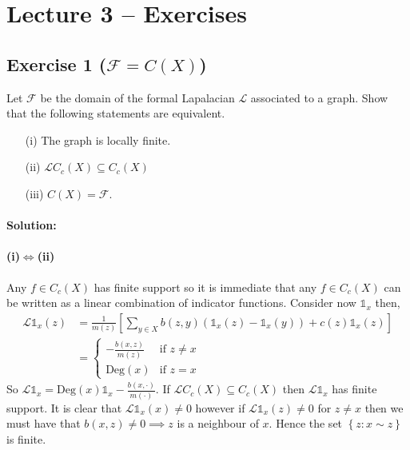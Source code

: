 \section{Lecture 3 -- Exercises}

\subsection{Exercise 1 (\texorpdfstring{$\mathcal{F}=C(X)$}))}

Let $\mathcal{F}$ be the domain of the formal Lapalacian $\mathcal{L}$ associated to a graph. Show that the following statements are equivalent.
\begin{itemize}
	\item [(i)]
		The graph is locally finite.
	\item [(ii)]
		$\mathcal{L}C_{c}(X)\subseteq C_{c}(X)$
	\item [(iii)]
		$C(X) = \mathcal{F}$.
\end{itemize}

\paragraph{Solution:}
\paragraph{(i)$\iff$(ii)}
Any $f\in C_{c}(X)$ has finite support so it is immediate that any $f\in C_{c}(X)$ can be written as a linear combination of indicator functions. Consider now $\mathds{1}_{x}$ then,
\begin{equation*}
	\begin{aligned}
		\mathcal{L}\mathds{1}_{x}(z) &= \frac{1}{m(z)}\left[\sum_{y\in X}b(z,y)(\mathds{1}_{x}(z) - \mathds{1}_{x}(y)) + c(z)\mathds{1}_{x}(z)\right]\\
		&=
		\begin{cases}
			-\frac{b(x,z)}{m(z)}& \text{if }z\neq x\\
			\text{Deg}(x)& \text{if }z=x
		\end{cases}
	\end{aligned}
\end{equation*}
So $\mathcal{L}\mathds{1}_{x} = \text{Deg}(x)\mathds{1}_{x} - \frac{b(x,\cdot)}{m(\cdot)}$. If $\mathcal{L}C_{c}(X)\subseteq C_{c}(X)$ then $\mathcal{L}\mathds{1}_{x}$ has finite support. It is clear that $\mathcal{L}\mathds{1}_{x}(x)\neq 0$ however if $\mathcal{L}\mathds{1}_{x}(z)\neq 0$ for $z\neq x$ then we must have that $b(x,z)\neq 0\implies z$ is a neighbour of $x$. Hence the set $\left\{z\colon x\sim z\right\}$ is finite.


